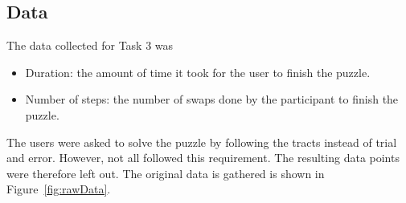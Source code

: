 \documentclass[a4paper, 12pt]{report}
\begin{document}
\subsection{Data}

The data collected for Task 3 was 
\begin{itemize}
	\item Duration: the amount of time it took for the user to finish the puzzle.
	\item Number of steps: the number of swaps done by the participant to finish the puzzle.
\end{itemize}
The users were asked to solve the puzzle by following the tracts instead of trial and error. However, not all followed this requirement. The resulting data points were therefore left out. The original data is gathered is shown in Figure~\ref{fig:rawData}.



\end{document}
